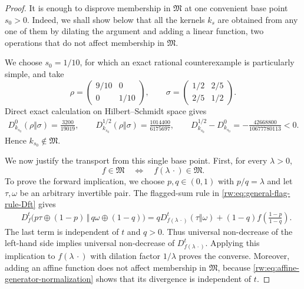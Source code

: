 \documentclass[11pt]{article}
\theoremstyle{remark}
\newcommand{\1}{\mathbbm{1}}
\begin{document}
\begin{proof}
It is enough to disprove membership in $\mathfrak M$ at one convenient
base point $s_0>0$.  Indeed, we shall show below that all the kernels
$k_s$ are obtained from any one of them by dilating the argument and
adding a linear function, two operations that do not affect membership
in $\mathfrak M$.

We choose $s_0=1/10$, for which an exact rational counterexample is
particularly simple, and take
\begin{equation}
 \rho=\begin{pmatrix}9/10&0\\0&1/10\end{pmatrix},\qquad
 \sigma=\begin{pmatrix}1/2&2/5\\2/5&1/2\end{pmatrix}.
\end{equation}
Direct exact calculation on Hilbert--Schmidt space gives
\begin{align}
 D_{k_{s_0}}^0(\rho\Vert\sigma)=\frac{3200}{19019},\qquad
 D_{k_{s_0}}^{1/2}(\rho\Vert\sigma)
 =\frac{1014400}{6175697},\qquad
 D_{k_{s_0}}^{1/2}-D_{k_{s_0}}^0
 =-\frac{42668800}{10677780113}<0.
 \label{rw:eq:kernel-exact-counterexample}
\end{align}
Hence $k_{s_0}\notin\mathfrak M$.

We now justify the transport from this single base point.  First, for
every $\lambda>0$,
\begin{equation*}
 f\in\mathfrak M
 \quad\Longleftrightarrow\quad
 f(\lambda\,\cdot)\in\mathfrak M.
\end{equation*}
To prove the forward implication, we choose $p,q\in(0,1)$ with
$p/q=\lambda$ and let $\tau,\omega$ be an arbitrary invertible pair.
The flagged-sum rule in
\eqref{rw:eq:general-flag-rule-Dft} gives
\begin{align}
 &D_f^t\bigl(p\tau\oplus(1-p)\,\big\Vert\,
                 q\omega\oplus(1-q)\bigr)
 =qD_{f(\lambda\,\cdot)}^t(\tau\Vert\omega)
 +(1-q)f\left(\frac{1-p}{1-q}\right).
 \label{rw:eq:universal-cone-dilation}
\end{align}
The last term is independent of $t$ and $q>0$.  Thus universal
non-decrease of the left-hand side implies universal non-decrease of
$D_{f(\lambda\,\cdot)}^t$.  Applying this implication to
$f(\lambda\,\cdot)$ with dilation factor $1/\lambda$ proves the
converse.  Moreover, adding an affine function does not affect
membership in $\mathfrak M$, because
\eqref{rw:eq:affine-generator-normalization} shows that its divergence
is independent of $t$.


\end{proof}
\end{document}
